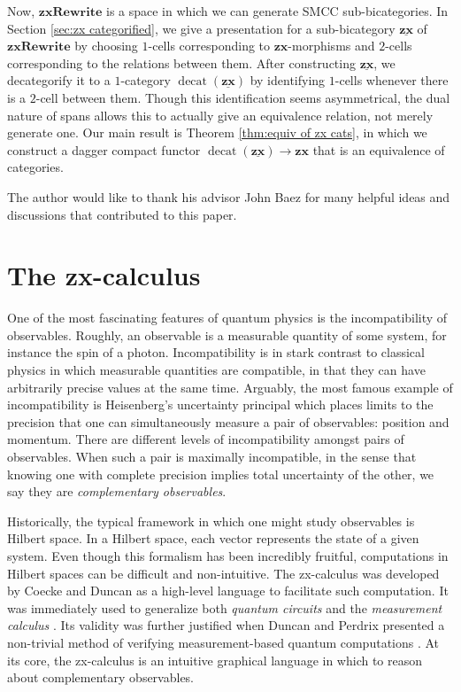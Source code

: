 \documentclass[]{amsart}
\theoremstyle{defn}
\begin{document}
Now, $\mathbf{zxRewrite}$ is a space in which we can generate SMCC sub-bicategories. In Section \ref{sec:zx categorified}, we give a presentation for a sub-bicategory $\underline{\mathbf{zx}}$ of $\mathbf{zxRewrite}$ by choosing $1$-cells corresponding to $\mathbf{zx}$-morphisms and $2$-cells corresponding to the relations between them.  After constructing $\underline{\mathbf{zx}}$, we decategorify it to a $1$-category $\operatorname{decat}(\underline{\mathbf{zx}})$ by identifying $1$-cells whenever there is a $2$-cell between them.  Though this identification seems asymmetrical, the dual nature of spans allows this to actually give an equivalence relation, not merely generate one.  Our main result is Theorem \ref{thm:equiv of zx cats}, in which we construct a dagger compact functor $\operatorname{decat}(\underline{\mathbf{zx}}) \to \mathbf{zx}$ that is an equivalence of categories.  

The author would like to thank his advisor John Baez for many helpful ideas and discussions that contributed to this paper.   

\section{The zx-calculus}
\label{sec:ZxCalc}

One of the most fascinating features of quantum physics is the incompatibility of observables. Roughly, an observable is a measurable quantity of some system, for instance the spin of a photon.  Incompatibility is in stark contrast to classical physics in which measurable quantities are compatible, in that they can have arbitrarily precise values at the same time.   Arguably, the most famous example of incompatibility is Heisenberg's uncertainty principal which places limits to the precision that one can simultaneously measure a pair of observables: position and momentum.  There are different levels of incompatibility amongst pairs of observables. When such a pair is maximally incompatible, in the sense that knowing one with complete precision implies total uncertainty of the other, we say they are \emph{complementary observables}.  

Historically, the typical framework in which one might study observables is Hilbert space.  In a Hilbert space, each vector represents the state of a given system. Even though this formalism has been incredibly fruitful, computations in Hilbert spaces can be difficult and non-intuitive. The zx-calculus was developed by Coecke and Duncan \cite{CoeckeDuncan_QuantumObsFullPaper} as a high-level language to facilitate such computation.  It was immediately used to generalize both \emph{quantum circuits} \cite{NielsenChuang_QuantumCompInfo}  and the \emph{measurement calculus} \cite{DanosKashefiPanang_MeasurementCalc}. Its validity was further justified when Duncan and Perdrix presented a non-trivial method of verifying measurement-based quantum computations \cite{DuncanPerdrix_RewritingQuantumCompu}.  At its core, the zx-calculus is an intuitive graphical language in which to reason about complementary observables. 
\end{document}
